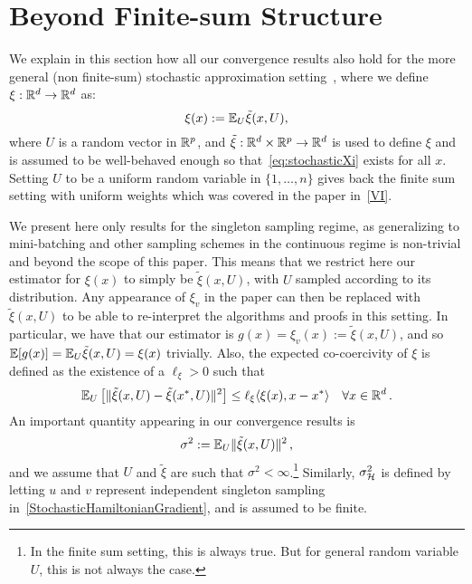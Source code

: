 \documentclass{article}
\begin{document}
\section{Beyond Finite-sum Structure}
\label{Appendix_BeyondFiniteSum}

We explain in this section how all our convergence results also hold for the more general (non finite-sum) stochastic approximation setting~\citep{Nemirovski-Juditsky-Lan-Shapiro-2009}, where we define $\xi: \mathbb{R}^d \rightarrow \mathbb{R}^d$ as:
\begin{equation} \label{eq:stochasticXi}
\xi(x) := \mathbb{E}_U \tilde{\xi}(x, U) ,
\end{equation}
where $U$ is a random vector in $\mathbb{R}^p$, and $\tilde{\xi} : \mathbb{R}^d\times \mathbb{R}^p \rightarrow \mathbb{R}^d$ is used to define $\xi$ and is assumed to be well-behaved enough so that~\eqref{eq:stochasticXi} exists for all $x$. Setting $U$ to be a uniform random variable in $\{1, \ldots, n\}$ gives back the finite sum setting with uniform weights which was covered in the paper in~\eqref{VI}.

We present here only results for the singleton sampling regime, as generalizing to mini-batching and other sampling schemes in the continuous regime is non-trivial and beyond the scope of this paper. This means that we restrict here our estimator for $\xi(x)$ to simply be $\tilde{\xi}(x,U)$, with $U$ sampled according to its distribution. Any appearance of $\xi_v$ in the paper can then be replaced with $\tilde{\xi}(x,U)$ to be able to re-interpret the algorithms and proofs in this setting. In particular, we have that our estimator is  $g(x) = \xi_v(x) := \tilde{\xi}(x,U)$, and so $\mathbb{E}[ g(x) ] = \mathbb{E}_U \tilde{\xi}(x,U) = \xi(x)$ trivially. Also, the expected co-coercivity of $\xi$ is defined as the existence of a $\ell_\xi > 0$ such that
\begin{equation} \label{eq:EC_stochastic}
\mathbb{E}_U \left[ \| \tilde{\xi}(x,U) - \tilde{\xi}(x^*,U)\|^2 \right] \leq \ell_\xi \langle \xi(x) , x - x^* \rangle \quad \forall x \in \mathbb{R}^d \, .
\end{equation}
An important quantity appearing in our convergence results is 
\begin{equation}
\sigma^2 := \mathbb{E}_U \| \tilde{\xi}(x,U) \|^2 \, ,
\end{equation}
and we assume that $U$ and $\tilde{\xi}$ are such that $\sigma^2 < \infty$.\footnote{In the finite sum setting, this is always true. But for general random variable $U$, this is not always the case.} Similarly, $\sigma_{\cal H}^2$ is defined by letting $u$ and $v$ represent independent singleton sampling in~\eqref{StochasticHamiltonianGradient}, and is assumed to be finite.
\end{document}
